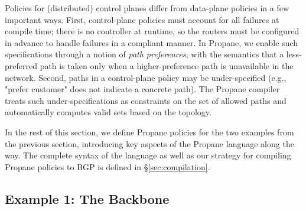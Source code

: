\documentclass[10pt]{sigalternate052015}
\newcommand{\sysname}{{\small \sf Propane}\xspace}
\begin{document}
Policies for (distributed) control planes differ from data-plane
policies in a few important ways. First, control-plane
policies must account for all failures at compile time; there is
no controller at runtime, so the routers must be configured in advance to handle failures in a compliant manner.
%
In \sysname, we enable such specifications through a notion of {\em path preferences}, with the semantics that a less-preferred path is taken only when a higher-preference path is unavailable in the network.
%
Second, paths in a control-plane policy may be under-specified (e.g.,
"prefer customer" does not indicate a concrete path). The \sysname
compiler treats such under-specifications as constraints on the set of
allowed paths and automatically computes valid sets based on the topology.
%

In the rest of this section, we define \sysname policies for the two 
examples from the previous section, introducing key aspects of
the \sysname language along the way. The complete syntax of the
language as well as our strategy for compiling \sysname policies to
BGP is defined in \S\ref{sec:compilation}.

\subsection{Example 1: The Backbone}

\end{document}
